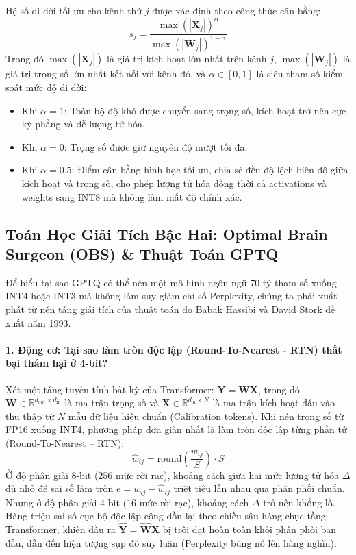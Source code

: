 Hệ số di dời tối ưu cho kênh thứ $j$ được xác định theo công thức cân bằng:
\begin{equation}
s_j = \frac{\max(|\mathbf{X}_j|)^\alpha}{\max(|\mathbf{W}_j|)^{1-\alpha}}
\end{equation}
Trong đó $\max(|\mathbf{X}_j|)$ là giá trị kích hoạt lớn nhất trên kênh $j$, $\max(|\mathbf{W}_j|)$ là giá trị trọng số lớn nhất kết nối với kênh đó, và $\alpha \in [0, 1]$ là siêu tham số kiểm soát mức độ di dời:
\begin{itemize}
  \item Khi $\alpha = 1$: Toàn bộ độ khó được chuyển sang trọng số, kích hoạt trở nên cực kỳ phẳng và dễ lượng tử hóa.
  \item Khi $\alpha = 0$: Trọng số được giữ nguyên độ mượt tối đa.
  \item Khi $\alpha = 0.5$: Điểm cân bằng hình học tối ưu, chia sẻ đều độ lệch biên độ giữa kích hoạt và trọng số, cho phép lượng tử hóa đồng thời cả activations và weights sang INT8 mà không làm mất độ chính xác.
\end{itemize}

\subsection{Toán Học Giải Tích Bậc Hai: Optimal Brain Surgeon (OBS) \& Thuật Toán GPTQ}
\label{sec:obs-gptq-math}

Để hiểu tại sao GPTQ có thể nén một mô hình ngôn ngữ 70 tỷ tham số xuống INT4 hoặc INT3 mà không làm suy giảm chỉ số Perplexity, chúng ta phải xuất phát từ nền tảng giải tích của thuật toán  do Babak Hassibi và David Stork đề xuất năm 1993.

\paragraph{1. Động cơ: Tại sao làm tròn độc lập (Round-To-Nearest - RTN) thất bại thảm hại ở 4-bit?}
Xét một tầng tuyến tính bất kỳ của Transformer: $\mathbf{Y} = \mathbf{W} \mathbf{X}$, trong đó $\mathbf{W} \in \mathbb{R}^{d_{\text{out}} \times d_{\text{in}}}$ là ma trận trọng số và $\mathbf{X} \in \mathbb{R}^{d_{\text{in}} \times N}$ là ma trận kích hoạt đầu vào thu thập từ $N$ mẫu dữ liệu hiệu chuẩn (Calibration tokens).
Khi nén trọng số từ FP16 xuống INT4, phương pháp đơn giản nhất là làm tròn độc lập từng phần tử (Round-To-Nearest -- RTN):
\begin{equation}
\hat{w}_{ij} = \text{round}\left( \frac{w_{ij}}{S} \right) \cdot S
\end{equation}
Ở độ phân giải 8-bit ($256$ mức rời rạc), khoảng cách giữa hai mức lượng tử hóa $\Delta$ đủ nhỏ để sai số làm tròn $e = w_{ij} - \hat{w}_{ij}$ triệt tiêu lẫn nhau qua phân phối chuẩn. Nhưng ở độ phân giải 4-bit ($16$ mức rời rạc), khoảng cách $\Delta$ trở nên khổng lồ. Hàng triệu sai số cục bộ độc lập cộng dồn lại theo chiều sâu hàng chục tầng Transformer, khiến đầu ra $\widehat{\mathbf{Y}} = \widehat{\mathbf{W}} \mathbf{X}$ bị trôi dạt hoàn toàn khỏi phân phối ban đầu, dẫn đến hiện tượng sụp đổ suy luận (Perplexity bùng nổ lên hàng nghìn).

